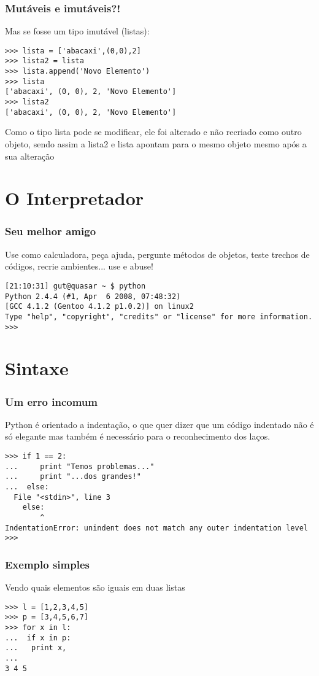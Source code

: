 \documentclass{beamer}
\begin{document}
\begin{frame}[containsverbatim]
\frametitle{Mutáveis e imutáveis?!}
Mas se fosse um tipo imutável (listas):
 \begin{lstlisting}
>>> lista = ['abacaxi',(0,0),2]
>>> lista2 = lista
>>> lista.append('Novo Elemento')
>>> lista
['abacaxi', (0, 0), 2, 'Novo Elemento']
>>> lista2
['abacaxi', (0, 0), 2, 'Novo Elemento']
 \end{lstlisting}
Como o tipo lista pode se modificar, ele foi alterado e não recriado como outro objeto, sendo assim a lista2 e lista apontam para o mesmo objeto mesmo após a sua alteração
\end{frame}

\section{O Interpretador}
\begin{frame}[containsverbatim]
\frametitle{Seu melhor amigo}
Use como calculadora, peça ajuda, pergunte métodos de objetos, teste trechos de códigos, recrie ambientes... use e abuse!
 \begin{lstlisting}
[21:10:31] gut@quasar ~ $ python
Python 2.4.4 (#1, Apr  6 2008, 07:48:32)
[GCC 4.1.2 (Gentoo 4.1.2 p1.0.2)] on linux2
Type "help", "copyright", "credits" or "license" for more information.
>>>
 \end{lstlisting}
\end{frame}

\section{Sintaxe}
\begin{frame}[containsverbatim]
\frametitle{Um erro incomum}
Python é orientado a indentação, o que quer dizer que um código indentado não é só elegante mas também é necessário para o reconhecimento dos laços.
 \begin{lstlisting}
>>> if 1 == 2:
...     print "Temos problemas..."
...     print "...dos grandes!"
...  else:
  File "<stdin>", line 3
    else:
        ^
IndentationError: unindent does not match any outer indentation level
>>>
 \end{lstlisting}
\end{frame}

\begin{frame}[containsverbatim]
\frametitle{Exemplo simples}
Vendo quais elementos são iguais em duas listas
 \begin{lstlisting}
>>> l = [1,2,3,4,5]
>>> p = [3,4,5,6,7]
>>> for x in l:
...  if x in p:
...   print x,
...
3 4 5
 \end{lstlisting}
\end{frame}
\end{document}
